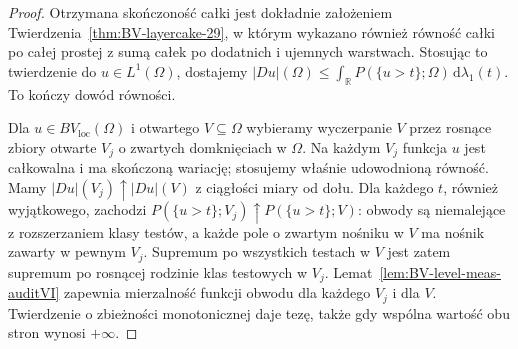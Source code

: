 \begin{proof}
Otrzymana skończoność całki jest dokładnie
założeniem Twierdzenia~\ref{thm:BV-layercake-29},
w którym wykazano również równość całki
po całej prostej z sumą całek po dodatnich
i ujemnych warstwach. Stosując to twierdzenie
do $u\in L^1(\Omega)$, dostajemy
$|Du|(\Omega)\le\int_{\mathbb R}
P(\{u>t\};\Omega)\,\mathrm d\lambda_1(t)$.
To kończy dowód równości.

Dla $u\in BV_{\mathrm{loc}}(\Omega)$ i otwartego
$V\subseteq\Omega$ wybieramy wyczerpanie $V$
przez rosnące zbiory otwarte $V_j$ o zwartych
domknięciach w $\Omega$. Na każdym $V_j$
funkcja $u$ jest całkowalna i ma skończoną
wariację; stosujemy właśnie udowodnioną równość.
Mamy $|Du|(V_j)\uparrow|Du|(V)$ z ciągłości
miary od dołu. Dla każdego $t$, również
wyjątkowego, zachodzi
$P(\{u>t\};V_j)\uparrow P(\{u>t\};V)$:
obwody są niemalejące z rozszerzaniem klasy
testów, a każde pole o zwartym nośniku w $V$
ma nośnik zawarty w pewnym $V_j$.
Supremum po wszystkich testach w $V$
jest zatem supremum po rosnącej rodzinie
klas testowych w $V_j$.
Lemat~\ref{lem:BV-level-meas-auditVI}
zapewnia mierzalność funkcji obwodu
dla każdego $V_j$ i dla $V$.
Twierdzenie o zbieżności monotonicznej
daje tezę, także gdy wspólna wartość
obu stron wynosi $+\infty$.
\end{proof}

